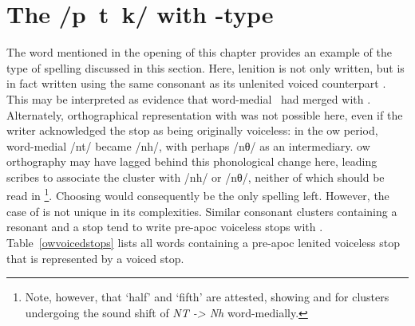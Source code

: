 \section{The /p~t~k/ with -type}
\label{ptkwithbdg}
The word  mentioned in the opening of this chapter provides an example of the type of spelling discussed in this section. Here, lenition is not only written, but is in fact written using the same consonant as its unlenited voiced counterpart . This may be interpreted as evidence that word-medial \xT\ had merged with \xD.  Alternately, orthographical representation with  was not possible here, even if the writer acknowledged the stop as being originally voiceless: in the \gls{ow} period, word-medial /nt/ became /nh/, with perhaps /nθ/ as an intermediary. \Gls{ow} orthography may have lagged behind this phonological change here, leading scribes to associate the cluster  with /nh/ or /nθ/, neither of which should be read in \footnote{Note, however, that  `half' and  `fifth' are attested, showing  and  for clusters undergoing the sound shift of \textit{NT -> Nh} word-medially.}. Choosing  would consequently be the only spelling left. However, the case of  is not unique in its complexities. Similar consonant clusters containing a resonant and a stop tend to write pre-\gls{apoc} voiceless stops with . Table~\ref{owvoicedstops} lists all words containing a pre-\gls{apoc} lenited voiceless stop that is represented by a voiced stop.

